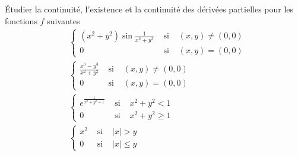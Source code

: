 \'Etudier la continuit{\'e}, l'existence et la continuit{\'e} des d{\'e}riv{\'e}es partielles pour les fonctions $f$ suivantes
\begin{align*}
&\left\{
\begin{aligned}
(x^{2}+y^{2})\sin \frac{1}{x^{2}+y^{2}} & \text{ si } & (x,y)\neq (0,0) \\
0 & \text{ si } & (x,y)=(0,0)
\end{aligned}
\right.  \\
&\left\{
\begin{aligned}
\frac{x^{3}-y^{3}}{x^{2}+y^{2}} & \text{ si } & (x,y)\neq (0,0) \\
0 & \text{ si } & (x,y)=(0,0)
\end{aligned}
\right.  \\
&\left\{
\begin{aligned}
e^{\frac{1}{x^{2}+y^{2}-1}} & \text{ si } & x^{2}+y^{2}<1 \\
0 & \text{ si } & x^{2}+y^{2}\geq 1
\end{aligned}
\right.  \\
&\left\{
\begin{aligned}
x^{2} & \text{ si } & \left| x\right| >y \\
0 & \text{ si } & \left| x\right| \leq y
\end{aligned}
\right.
\end{align*}